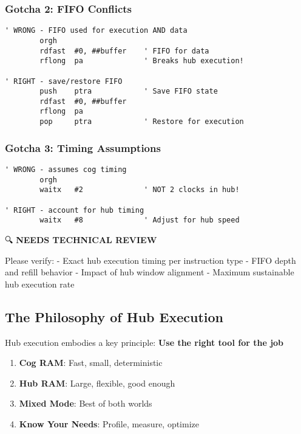 \documentclass[11pt]{book}
\providecommand{\tightlist}{%
  \setlength{\itemsep}{0pt}\setlength{\parskip}{0pt}}
\begin{document}
\hypertarget{gotcha-2-fifo-conflicts}{%
\subsubsection{Gotcha 2: FIFO Conflicts}\label{gotcha-2-fifo-conflicts}}

\begin{lstlisting}
' WRONG - FIFO used for execution AND data
        orgh
        rdfast  #0, ##buffer    ' FIFO for data
        rflong  pa              ' Breaks hub execution!
        
' RIGHT - save/restore FIFO
        push    ptra            ' Save FIFO state
        rdfast  #0, ##buffer
        rflong  pa
        pop     ptra            ' Restore for execution
\end{lstlisting}

\hypertarget{gotcha-3-timing-assumptions}{%
\subsubsection{Gotcha 3: Timing
Assumptions}\label{gotcha-3-timing-assumptions}}

\begin{lstlisting}
' WRONG - assumes cog timing
        orgh
        waitx   #2              ' NOT 2 clocks in hub!
        
' RIGHT - account for hub timing
        waitx   #8              ' Adjust for hub speed
\end{lstlisting}

\begin{review}
🔍 \textbf{NEEDS TECHNICAL REVIEW}

Please verify:
- Exact hub execution timing per instruction type
- FIFO depth and refill behavior
- Impact of hub window alignment
- Maximum sustainable hub execution rate
\end{review}

\hypertarget{the-philosophy-of-hub-execution}{%
\subsection{The Philosophy of Hub
Execution}\label{the-philosophy-of-hub-execution}}

Hub execution embodies a key principle: \textbf{Use the right tool for
the job}

\begin{enumerate}
\def\labelenumi{\arabic{enumi}.}
\tightlist
\item
  \textbf{Cog RAM}: Fast, small, deterministic
\item
  \textbf{Hub RAM}: Large, flexible, good enough
\item
  \textbf{Mixed Mode}: Best of both worlds
\item
  \textbf{Know Your Needs}: Profile, measure, optimize
\end{enumerate}
\end{document}
